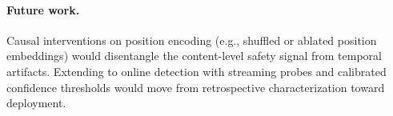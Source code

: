 \paragraph{Future work.} Causal interventions on position encoding (e.g., shuffled or ablated position embeddings) would disentangle the content-level safety signal from temporal artifacts. Extending to online detection with streaming probes and calibrated confidence thresholds would move from retrospective characterization toward deployment.
